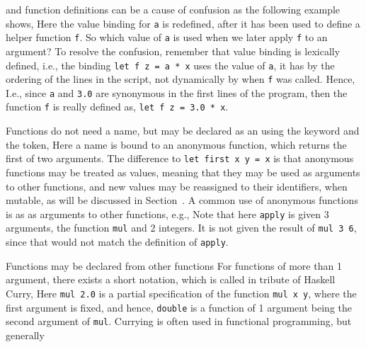  and function definitions can be a cause of confusion as the following example shows,
%
%
Here the value binding for \lstinline!a! is redefined, after it has been used to define a helper function \lstinline!f!. So which value of \lstinline!a! is used when we later apply \lstinline!f! to an argument? To resolve the confusion, remember that value binding is lexically defined, i.e., the binding \lstinline!let f z = a * x! uses the value of \lstinline!a!, it has by the ordering of the lines in the script, not dynamically by when \lstinline!f! was called. Hence,  I.e., since \lstinline!a! and \lstinline!3.0! are synonymous in the first lines of the program, then the function \lstinline!f! is really defined as, \lstinline!let f z = 3.0 * x!. 

Functions do not need a name, but may be declared as an  using the  keyword and the \token{->} token,
%
%
Here a name is bound to an anonymous function, which returns the first of two arguments. The difference to \lstinline!let first x y = x! is that anonymous functions may be treated as values, meaning that they may be used as arguments to other functions, and new values may be reassigned to their identifiers, when mutable, as will be discussed in Section~\label{sec:mutableValues}. A common use of anonymous functions is as as arguments to other functions, e.g.,
%
%
Note that here \lstinline!apply! is given 3 arguments, the function \lstinline!mul! and 2 integers. It is not given the result of \lstinline!mul 3 6!, since that would not match the definition of \lstinline!apply!. 

Functions may be declared from other functions
For functions of more than 1 argument, there exists a short notation, which is called  in tribute of Haskell Curry,
%
%
Here \lstinline{mul 2.0} is a partial specification of the function \lstinline{mul x y}, where the first argument is fixed, and hence, \lstinline{double} is a function of 1 argument being the second argument of \lstinline{mul}. Currying is often used in functional programming, but generally 

